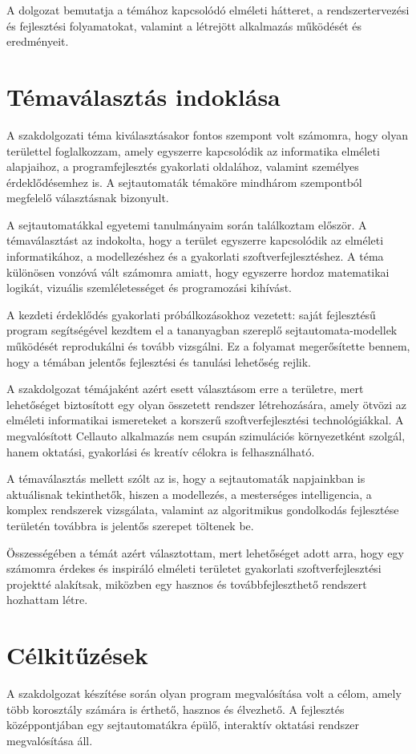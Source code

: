 \documentclass{thesis-ekf}
\begin{document}
A dolgozat bemutatja a témához kapcsolódó elméleti hátteret, a rendszertervezési és fejlesztési folyamatokat, valamint a létrejött alkalmazás működését és eredményeit.

\section{Témaválasztás indoklása}
A szakdolgozati téma kiválasztásakor fontos szempont volt számomra, hogy olyan területtel foglalkozzam, amely egyszerre kapcsolódik az informatika elméleti alapjaihoz, a programfejlesztés gyakorlati oldalához, valamint személyes érdeklődésemhez is. A sejtautomaták témaköre mindhárom szempontból megfelelő választásnak bizonyult.

A sejtautomatákkal egyetemi tanulmányaim során találkoztam először. A témaválasztást az indokolta, hogy a terület egyszerre kapcsolódik az elméleti informatikához, a modellezéshez és a gyakorlati szoftverfejlesztéshez. A téma különösen vonzóvá vált számomra amiatt, hogy egyszerre hordoz matematikai logikát, vizuális szemléletességet és programozási kihívást.

A kezdeti érdeklődés gyakorlati próbálkozásokhoz vezetett: saját fejlesztésű program segítségével kezdtem el a tananyagban szereplő sejtautomata-modellek működését reprodukálni és tovább vizsgálni. Ez a folyamat megerősítette bennem, hogy a témában jelentős fejlesztési és tanulási lehetőség rejlik.

A szakdolgozat témájaként azért esett választásom erre a területre, mert lehetőséget biztosított egy olyan összetett rendszer létrehozására, amely ötvözi az elméleti informatikai ismereteket a korszerű szoftverfejlesztési technológiákkal. A megvalósított Cellauto alkalmazás nem csupán szimulációs környezetként szolgál, hanem oktatási, gyakorlási és kreatív célokra is felhasználható.

A témaválasztás mellett szólt az is, hogy a sejtautomaták napjainkban is aktuálisnak tekinthetők, hiszen a modellezés, a mesterséges intelligencia, a komplex rendszerek vizsgálata, valamint az algoritmikus gondolkodás fejlesztése területén továbbra is jelentős szerepet töltenek be.

Összességében a témát azért választottam, mert lehetőséget adott arra, hogy egy számomra érdekes és inspiráló elméleti területet gyakorlati szoftverfejlesztési projektté alakítsak, miközben egy hasznos és továbbfejleszthető rendszert hozhattam létre.

\section{Célkitűzések}
A szakdolgozat készítése során olyan program megvalósítása volt a célom, amely több korosztály számára is érthető, hasznos és élvezhető. A fejlesztés középpontjában egy sejtautomatákra épülő, interaktív oktatási rendszer megvalósítása áll.
\end{document}
